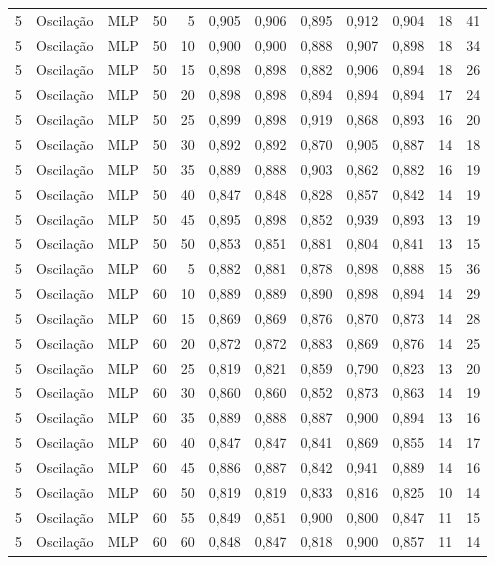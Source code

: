\begin{longtable}{@{}rllrrrrrrrrr@{}}
5 & Oscilação & MLP & 50 & 5 & 0,905 & 0,906 & 0,895 & 0,912 & 0,904 & 18 & 41 \\
5 & Oscilação & MLP & 50 & 10 & 0,900 & 0,900 & 0,888 & 0,907 & 0,898 & 18 & 34 \\
5 & Oscilação & MLP & 50 & 15 & 0,898 & 0,898 & 0,882 & 0,906 & 0,894 & 18 & 26 \\
5 & Oscilação & MLP & 50 & 20 & 0,898 & 0,898 & 0,894 & 0,894 & 0,894 & 17 & 24 \\
5 & Oscilação & MLP & 50 & 25 & 0,899 & 0,898 & 0,919 & 0,868 & 0,893 & 16 & 20 \\
5 & Oscilação & MLP & 50 & 30 & 0,892 & 0,892 & 0,870 & 0,905 & 0,887 & 14 & 18 \\
5 & Oscilação & MLP & 50 & 35 & 0,889 & 0,888 & 0,903 & 0,862 & 0,882 & 16 & 19 \\
5 & Oscilação & MLP & 50 & 40 & 0,847 & 0,848 & 0,828 & 0,857 & 0,842 & 14 & 19 \\
5 & Oscilação & MLP & 50 & 45 & 0,895 & 0,898 & 0,852 & 0,939 & 0,893 & 13 & 19 \\
5 & Oscilação & MLP & 50 & 50 & 0,853 & 0,851 & 0,881 & 0,804 & 0,841 & 13 & 15 \\
5 & Oscilação & MLP & 60 & 5 & 0,882 & 0,881 & 0,878 & 0,898 & 0,888 & 15 & 36 \\
5 & Oscilação & MLP & 60 & 10 & 0,889 & 0,889 & 0,890 & 0,898 & 0,894 & 14 & 29 \\
5 & Oscilação & MLP & 60 & 15 & 0,869 & 0,869 & 0,876 & 0,870 & 0,873 & 14 & 28 \\
5 & Oscilação & MLP & 60 & 20 & 0,872 & 0,872 & 0,883 & 0,869 & 0,876 & 14 & 25 \\
5 & Oscilação & MLP & 60 & 25 & 0,819 & 0,821 & 0,859 & 0,790 & 0,823 & 13 & 20 \\
5 & Oscilação & MLP & 60 & 30 & 0,860 & 0,860 & 0,852 & 0,873 & 0,863 & 14 & 19 \\
5 & Oscilação & MLP & 60 & 35 & 0,889 & 0,888 & 0,887 & 0,900 & 0,894 & 13 & 16 \\
5 & Oscilação & MLP & 60 & 40 & 0,847 & 0,847 & 0,841 & 0,869 & 0,855 & 14 & 17 \\
5 & Oscilação & MLP & 60 & 45 & 0,886 & 0,887 & 0,842 & 0,941 & 0,889 & 14 & 16 \\
5 & Oscilação & MLP & 60 & 50 & 0,819 & 0,819 & 0,833 & 0,816 & 0,825 & 10 & 14 \\
5 & Oscilação & MLP & 60 & 55 & 0,849 & 0,851 & 0,900 & 0,800 & 0,847 & 11 & 15 \\
5 & Oscilação & MLP & 60 & 60 & 0,848 & 0,847 & 0,818 & 0,900 & 0,857 & 11 & 14 \\

\end{longtable}
